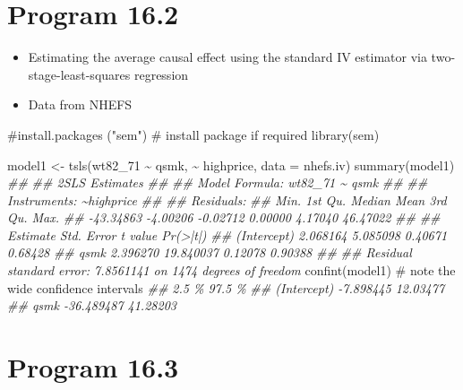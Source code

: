 \documentclass[
  10pt,
  a4paper,
]{book}
\newenvironment{Shaded}{\begin{snugshade}}{\end{snugshade}}
\newcommand{\AttributeTok}[1]{\textcolor[rgb]{0.40,0.45,0.13}{#1}}
\newcommand{\CommentTok}[1]{\textcolor[rgb]{0.37,0.37,0.37}{#1}}
\newcommand{\DocumentationTok}[1]{\textcolor[rgb]{0.37,0.37,0.37}{\textit{#1}}}
\newcommand{\FunctionTok}[1]{\textcolor[rgb]{0.28,0.35,0.67}{#1}}
\newcommand{\NormalTok}[1]{\textcolor[rgb]{0.00,0.46,0.62}{#1}}
\newcommand{\OtherTok}[1]{\textcolor[rgb]{0.00,0.46,0.62}{#1}}
\newcommand{\SpecialCharTok}[1]{\textcolor[rgb]{0.37,0.37,0.37}{#1}}
\providecommand{\tightlist}{%
  \setlength{\itemsep}{0pt}\setlength{\parskip}{0pt}}
\begin{document}
\hypertarget{program-16.2}{%
\section{Program 16.2}\label{program-16.2}}

\begin{itemize}
\tightlist
\item
  Estimating the average causal effect using the standard IV estimator via two-stage-least-squares regression
\item
  Data from NHEFS
\end{itemize}

\begin{Shaded}
\begin{Highlighting}[]
\CommentTok{\#install.packages ("sem") \# install package if required}
\FunctionTok{library}\NormalTok{(sem) }

\NormalTok{model1 }\OtherTok{\textless{}{-}} \FunctionTok{tsls}\NormalTok{(wt82\_71 }\SpecialCharTok{\textasciitilde{}}\NormalTok{ qsmk, }\SpecialCharTok{\textasciitilde{}}\NormalTok{ highprice, }\AttributeTok{data =}\NormalTok{ nhefs.iv)}
\FunctionTok{summary}\NormalTok{(model1)}
\DocumentationTok{\#\# }
\DocumentationTok{\#\#  2SLS Estimates}
\DocumentationTok{\#\# }
\DocumentationTok{\#\# Model Formula: wt82\_71 \textasciitilde{} qsmk}
\DocumentationTok{\#\# }
\DocumentationTok{\#\# Instruments: \textasciitilde{}highprice}
\DocumentationTok{\#\# }
\DocumentationTok{\#\# Residuals:}
\DocumentationTok{\#\#      Min.   1st Qu.    Median      Mean   3rd Qu.      Max. }
\DocumentationTok{\#\# {-}43.34863  {-}4.00206  {-}0.02712   0.00000   4.17040  46.47022 }
\DocumentationTok{\#\# }
\DocumentationTok{\#\#              Estimate Std. Error t value Pr(\textgreater{}|t|)}
\DocumentationTok{\#\# (Intercept)  2.068164   5.085098 0.40671  0.68428}
\DocumentationTok{\#\# qsmk         2.396270  19.840037 0.12078  0.90388}
\DocumentationTok{\#\# }
\DocumentationTok{\#\# Residual standard error: 7.8561141 on 1474 degrees of freedom}
\FunctionTok{confint}\NormalTok{(model1)  }\CommentTok{\# note the wide confidence intervals}
\DocumentationTok{\#\#                  2.5 \%   97.5 \%}
\DocumentationTok{\#\# (Intercept)  {-}7.898445 12.03477}
\DocumentationTok{\#\# qsmk        {-}36.489487 41.28203}
\end{Highlighting}
\end{Shaded}

\hypertarget{program-16.3}{%
\section{Program 16.3}\label{program-16.3}}
\end{document}

